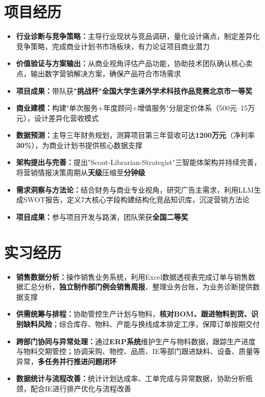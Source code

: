 \documentclass{resume}
\begin{document}
\section{项目经历}
\begin{itemize}[parsep=0.05ex]
  \item \textbf{行业诊断与竞争策略：}主导行业现状与竞品调研，量化设计痛点，制定差异化竞争策略，完成商业计划书市场板块，有力论证项目商业潜力
  \item \textbf{价值验证与方案输出：}从商业视角评估产品功能，协助技术团队确认核心卖点，输出数字营销解决方案，确保产品符合市场需求
  \item \textbf{项目成果：}带队获\textbf{"挑战杯"全国大学生课外学术科技作品竞赛北京市一等奖}
\end{itemize}
\begin{itemize}[parsep=0.05ex]
  \item \textbf{商业建模：}构建"单次服务+年度顾问+增值服务"分层定价体系（500元--15万元），设计差异化营收模式
  \item \textbf{数据预测：}主导三年财务规划，测算项目第三年营收可达\textbf{1200万元}（净利率\textbf{30\%}），为商业计划书提供核心数据支撑
\end{itemize}
\begin{itemize}[parsep=0.05ex]
  \item \textbf{架构提出与完善：}提出"Scout-Librarian-Strategist"三智能体架构并持续完善，将营销情报决策周期从\textbf{天级}压缩至\textbf{分钟级}
  \item \textbf{需求洞察与方法论：}结合财务与商业专业视角，研究广告主需求，利用LLM生成SWOT报告，定义7大核心字段构建结构化竞品知识库，沉淀营销方法论
  \item \textbf{项目成果：}参与项目开发与路演，团队荣获\textbf{全国二等奖}
\end{itemize}

\section{实习经历}
\begin{itemize}[parsep=0.05ex]
  \item \textbf{销售数据分析：}操作销售业务系统，利用Excel数据透视表完成订单与销售数据汇总分析，\textbf{独立制作部门例会销售周报}、整理业务台账，为业务诊断提供数据支撑
  \item \textbf{供需统筹与排程：}协助管控生产计划与物料，\textbf{核对BOM、跟进物料到货、识别缺料风险}；综合库存、物料、产能与换线成本排定工序，保障订单按期交付
  \item \textbf{跨部门协同与异常处理：}通过\textbf{ERP系统}维护生产与物料数据，跟踪生产进度与物料交期管控；协调采购、物控、品质、IE等部门跟进缺料、设备、质量等异常，\textbf{多任务并行推进问题闭环}
  \item \textbf{数据统计与流程改善：}统计计划达成率、工单完成与异常数据，协助分析瓶颈，配合IE进行排产优化与流程改善
\end{itemize}
\end{document}

